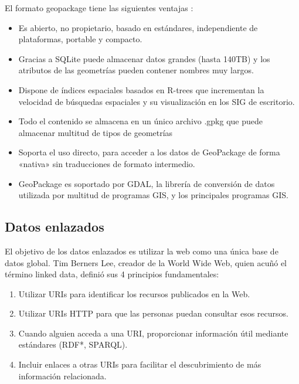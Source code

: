 El formato geopackage tiene las siguientes ventajas \cite{shapefile-no}:
\begin{itemize}

    \item Es abierto, no propietario, basado en estándares, independiente de plataformas,
        portable y compacto.

    \item Gracias a SQLite puede almacenar datos grandes (hasta 140TB)\cite{sqlite-limits} y los atributos de
        las geometrías pueden contener nombres muy largos.

    \item Dispone de índices espaciales basados en R-trees \cite{rtree} que incrementan la velocidad de búsquedas
        espaciales y su visualización en los SIG de escritorio.
       
    \item Todo el contenido se almacena en un único archivo .gpkg que puede almacenar multitud de tipos de
        geometrías

    \item Soporta el uso directo, para acceder a los datos de GeoPackage de forma «nativa» sin traducciones de
        formato intermedio.

    \item GeoPackage es soportado por GDAL\cite{gdal}, la librería de conversión de datos utilizada por multitud
        de programas GIS, y los principales programas GIS.
\end{itemize}


\subsection{Datos enlazados}
El objetivo de los datos enlazados es utilizar la web como una única base de datos global. Tim Berners Lee,
creador de la World Wide Web, quien acuñó el término linked data\cite{berners-lee}, definió sus 4 principios
fundamentales:

\begin{enumerate}
    \item Utilizar URIs para identificar los recursos publicados en la Web.
    \item Utilizar URIs HTTP para que las personas puedan consultar esos recursos.
    \item Cuando alguien acceda a una URI, proporcionar información útil mediante estándares (RDF*, SPARQL).
    \item Incluir enlaces a otras URIs para facilitar el descubrimiento de más información relacionada.
\end{enumerate}

